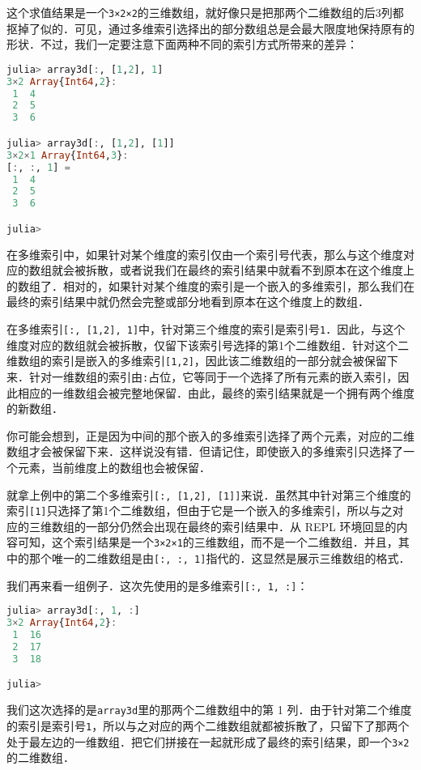 这个求值结果是一个\verb|3×2×2|的三维数组，就好像只是把那两个二维数组的后3列都抠掉了似的．可见，通过多维索引选择出的部分数组总是会最大限度地保持原有的形状．不过，我们一定要注意下面两种不同的索引方式所带来的差异：

\begin{lstlisting}[language=julia]
julia> array3d[:, [1,2], 1]
3×2 Array{Int64,2}:
 1  4
 2  5
 3  6

julia> array3d[:, [1,2], [1]]
3×2×1 Array{Int64,3}:
[:, :, 1] =
 1  4
 2  5
 3  6

julia> 
\end{lstlisting}

在多维索引中，如果针对某个维度的索引仅由一个索引号代表，那么与这个维度对应的数组就会被拆散，或者说我们在最终的索引结果中就看不到原本在这个维度上的数组了．相对的，如果针对某个维度的索引是一个嵌入的多维索引，那么我们在最终的索引结果中就仍然会完整或部分地看到原本在这个维度上的数组．

在多维索引\verb|[:, [1,2], 1]|中，针对第三个维度的索引是索引号\verb|1|．因此，与这个维度对应的数组就会被拆散，仅留下该索引号选择的第1个二维数组．针对这个二维数组的索引是嵌入的多维索引\verb|[1,2]|，因此该二维数组的一部分就会被保留下来．针对一维数组的索引由\verb|:|占位，它等同于一个选择了所有元素的嵌入索引，因此相应的一维数组会被完整地保留．由此，最终的索引结果就是一个拥有两个维度的新数组．

你可能会想到，正是因为中间的那个嵌入的多维索引选择了两个元素，对应的二维数组才会被保留下来．这样说没有错．但请记住，即使嵌入的多维索引只选择了一个元素，当前维度上的数组也会被保留．

就拿上例中的第二个多维索引\verb|[:, [1,2], [1]]|来说．虽然其中针对第三个维度的索引\verb|[1]|只选择了第1个二维数组，但由于它是一个嵌入的多维索引，所以与之对应的三维数组的一部分仍然会出现在最终的索引结果中．从 REPL 环境回显的内容可知，这个索引结果是一个\verb|3×2×1|的三维数组，而不是一个二维数组．并且，其中的那个唯一的二维数组是由\verb|[:, :, 1]|指代的．这显然是展示三维数组的格式．

我们再来看一组例子．这次先使用的是多维索引\verb|[:, 1, :]|：

\begin{lstlisting}[language=julia]
julia> array3d[:, 1, :]
3×2 Array{Int64,2}:
 1  16
 2  17
 3  18

julia> 
\end{lstlisting}

我们这次选择的是\verb|array3d|里的那两个二维数组中的第 1 列．由于针对第二个维度的索引是索引号\verb|1|，所以与之对应的两个二维数组就都被拆散了，只留下了那两个处于最左边的一维数组．把它们拼接在一起就形成了最终的索引结果，即一个\verb|3×2|的二维数组．

